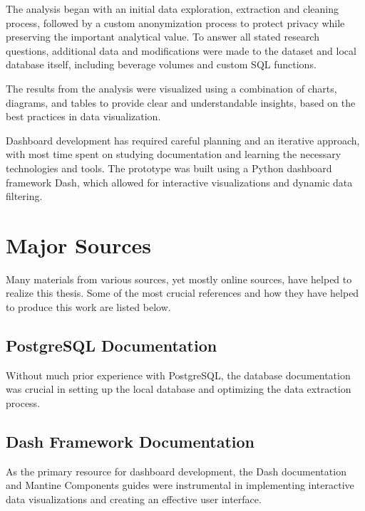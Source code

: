 The analysis began with an initial data exploration, extraction and cleaning process, followed by a custom anonymization process to protect privacy while preserving the important analytical value.
To answer all stated research questions, additional data and modifications were made to the dataset and local database itself, including beverage volumes and custom SQL functions.

The results from the analysis were visualized using a combination of charts, diagrams, and tables to provide clear and understandable insights, based on the best practices in data visualization.

Dashboard development has required careful planning and an iterative approach, with most time spent on studying documentation and learning the necessary technologies and tools.
The prototype was built using a Python dashboard framework Dash, which allowed for interactive visualizations and dynamic data filtering.

\pagebreak[4]

\section*{Major Sources}
\label{sec:major-sources}
Many materials from various sources, yet mostly online sources, have helped to realize this thesis.
Some of the most crucial references and how they have helped to produce this work are listed below.

\subsection*{PostgreSQL Documentation}
\label{subsec:postgresql-documentation}
Without much prior experience with PostgreSQL, the database documentation was crucial in setting up the local database and optimizing the data extraction process.

\small{}

\subsection*{Dash Framework Documentation}
\label{subsec:dash-framework-documentation}
As the primary resource for dashboard development, the Dash documentation and Mantine Components guides were instrumental in implementing interactive data visualizations and creating an effective user interface.

